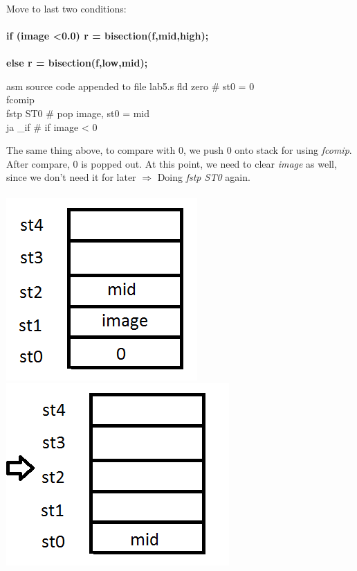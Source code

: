 \documentclass{article}
\begin{document}
\begin{multicols}{2}
\\ \\ 
\columnbreak
\\Move to last two conditions: \\ \\ \textbf{if (image \textless 0.0) r = bisection(f,mid,high);} \\ \\
\textbf{else r = bisection(f,low,mid);} \\
\begin{GFT}{asm source code appended to file lab5.s}
\+fld zero		\# st0 = 0\\
\+fcomip\\
\+fstp ST0		\# pop image, st0 = mid			\\
\+ja \_if			\# if image < 0\\
\end{GFT}
The same thing above, to compare with 0, we push 0 onto stack for using \textit{fcomip}. After compare, 0 is popped out. At this point, we need to clear \textit{image} as well, since we don't need it for later $\Rightarrow$ Doing \textit{fstp ST0} again. \\ \\
\includegraphics[scale=0.5]{stack6.png}
\includegraphics[scale=0.5]{stack7.png} \\
\end{multicols}
\end{document}
